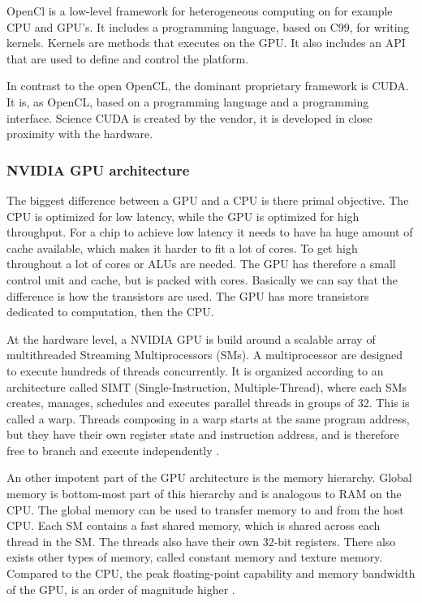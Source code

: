 OpenCl is a low-level framework for heterogeneous computing on for example CPU and GPU's. It includes a programming language, based on C99, for writing kernels. Kernels are methods that executes on the GPU. It also includes an API that are used to define and control the platform.

In contrast to the open OpenCL, the dominant proprietary framework is CUDA. It is, as OpenCL, based on a programming language and a programming interface. Science CUDA is created by the vendor, it is developed in close proximity with the hardware.


\subsubsection{NVIDIA GPU architecture} %
\label{ssub:nvidia_gpu_architecture}


The biggest difference between a GPU and a CPU is there primal objective. The CPU is optimized for low latency, while the GPU is optimized for high throughput. For a chip to achieve low latency it needs to have ha huge amount of cache available, which makes it harder to fit a lot of cores. To get high throughout a lot of cores or ALUs are needed. The GPU has therefore a small control unit and cache, but is packed with cores. Basically we can say that the difference is how the transistors are used. The GPU has more transistors dedicated to computation, then the CPU.

At the hardware level, a NVIDIA GPU is build around a scalable array of multithreaded Streaming Multiprocessors (SMs). A multiprocessor are designed to execute hundreds of threads concurrently. It is organized according to an architecture called SIMT (Single-Instruction, Multiple-Thread), where each SMs creates, manages, schedules and executes parallel threads in groups of 32. This is called a warp. Threads composing in a warp starts at the same program address, but they have their own register state and instruction address, and is therefore free to branch and execute independently \citep{cuda_programming_guide}.

An other impotent part of the GPU architecture is the memory hierarchy. Global memory is bottom-most part of this hierarchy and is analogous to RAM on the CPU. The global memory can be used to transfer memory to and from the host CPU. Each SM contains a fast shared memory, which is shared across each thread in the SM. The threads also have their own 32-bit registers. There also exists other types of memory, called constant memory and texture memory. Compared to the CPU, the peak floating-point capability and memory bandwidth of the GPU, is an order of magnitude higher \citep{LiangcuKnn}.


